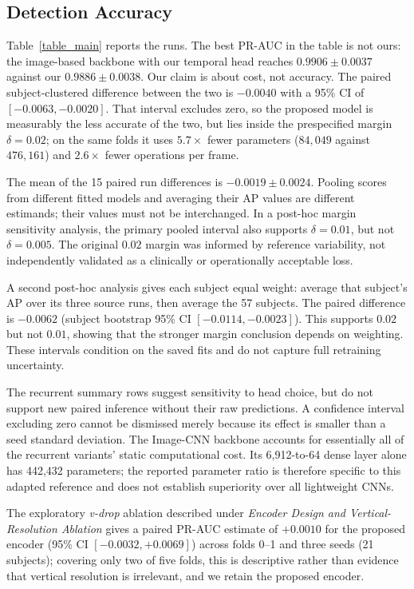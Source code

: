 \documentclass{IEEEmce}
\begin{document}
\subsection{Detection Accuracy}
\label{sec_accuracy}
Table~\ref{table_main} reports the runs. The best PR-AUC in the table is not ours: the
image-based backbone with our temporal head reaches $0.9906 \pm 0.0037$ against our
$0.9886 \pm 0.0038$. Our claim is about cost, not accuracy. The paired subject-clustered
difference between the two is $-0.0040$ with a 95\% CI of $[-0.0063,-0.0020]$. That
interval excludes zero, so the proposed model is measurably the less accurate of the
two, but lies inside the prespecified margin $\delta = 0.02$; on the same folds it uses
$5.7\times$ fewer parameters ($84{,}049$ against $476{,}161$) and $2.6\times$ fewer
operations per frame.

The mean of the 15 paired run differences is $-0.0019\pm0.0024$. Pooling scores from
different fitted models and averaging their AP values are different estimands; their
values must not be interchanged. In a post-hoc margin sensitivity analysis, the primary
pooled interval also supports $\delta=0.01$, but not $\delta=0.005$. The original
$0.02$ margin was informed by reference variability, not independently validated as a
clinically or operationally acceptable loss.

A second post-hoc analysis gives each subject equal weight: average that subject's AP
over its three source runs, then average the 57 subjects. The paired difference is
$-0.0062$ (subject bootstrap 95\% CI $[-0.0114,-0.0023]$). This supports $0.02$ but
not $0.01$, showing that the stronger margin conclusion depends on weighting.
These intervals condition on the saved fits and do not capture full retraining uncertainty.

The recurrent summary rows suggest sensitivity to head choice, but do not support
new paired inference without their raw predictions. A confidence interval excluding
zero cannot be dismissed merely because its effect is smaller than a seed standard
deviation. The Image-CNN backbone accounts for essentially all of the recurrent
variants' static computational cost. Its 6,912-to-64 dense layer alone has 442,432
parameters; the reported parameter ratio is therefore specific to this adapted
reference and does not establish superiority over all lightweight CNNs.


The exploratory \emph{v-drop} ablation described under \emph{Encoder Design and
Vertical-Resolution Ablation} gives a paired
PR-AUC estimate of $+0.0010$ for the proposed encoder (95\% CI $[-0.0032,+0.0069]$)
across folds 0--1 and three seeds (21 subjects); covering only two of five folds, this
is descriptive rather than evidence that vertical resolution is irrelevant, and we
retain the proposed encoder.
\end{document}
